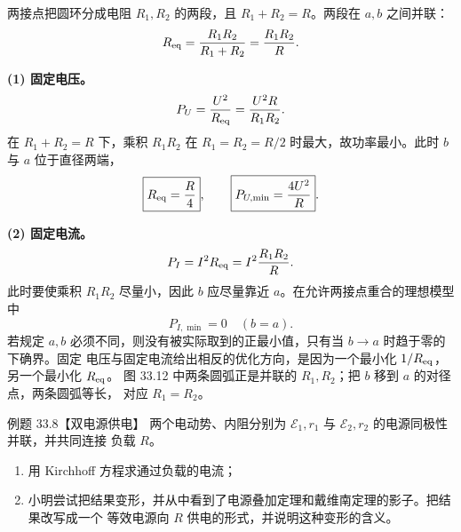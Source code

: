 \begin{xesolution}
两接点把圆环分成电阻 $R_1,R_2$ 的两段，且 $R_1+R_2=R$。两段在 $a,b$ 之间并联：
\begin{equation}
  R_{\rm eq}=\frac{R_1R_2}{R_1+R_2}=\frac{R_1R_2}{R}.
\end{equation}

\textbf{(1) 固定电压。}
\[
  P_U=\frac{U^2}{R_{\rm eq}}=\frac{U^2R}{R_1R_2}.
\]
在 $R_1+R_2=R$ 下，乘积 $R_1R_2$ 在 $R_1=R_2=R/2$ 时最大，故功率最小。此时 $b$ 与 $a$
位于直径两端，
\begin{equation}
  \boxed{R_{\rm eq}=\frac R4},
  \qquad
  \boxed{P_{U,\min}=\frac{4U^2}{R}}.
\end{equation}

\textbf{(2) 固定电流。}
\[
  P_I=I^2R_{\rm eq}=I^2\frac{R_1R_2}{R}.
\]
此时要使乘积 $R_1R_2$ 尽量小，因此 $b$ 应尽量靠近 $a$。在允许两接点重合的理想模型中
\begin{equation}
  \boxed{P_{I,\min}=0\quad(b=a)}.
\end{equation}
若规定 $a,b$ 必须不同，则没有被实际取到的正最小值，只有当 $b\to a$ 时趋于零的下确界。固定
电压与固定电流给出相反的优化方向，是因为一个最小化 $1/R_{\rm eq}$，另一个最小化
$R_{\rm eq}$。
图 33.12 中两条圆弧正是并联的 $R_1,R_2$；把 $b$ 移到 $a$ 的对径点，两条圆弧等长，
对应 $R_1=R_2$。

\ringResistanceDiagram
\end{xesolution}

\Needspace{0.4\textheight}
\begin{origexamplebox}{例题 33.8【双电源供电】}
两个电动势、内阻分别为 $\mathcal E_1,r_1$ 与 $\mathcal E_2,r_2$ 的电源同极性并联，并共同连接
负载 $R$。
\begin{enumerate}[label=(\arabic*),leftmargin=2.2em]
  \item 用 Kirchhoff 方程求通过负载的电流；
  \item 小明尝试把结果变形，并从中看到了电源叠加定理和戴维南定理的影子。把结果改写成一个
  等效电源向 $R$ 供电的形式，并说明这种变形的含义。
\end{enumerate}
\end{origexamplebox}

